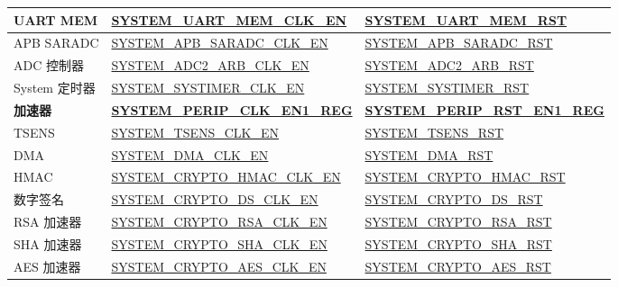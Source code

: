 \documentclass[main\_\_CN.tex]{subfiles}
\begin{document}
\begin{ThreePartTable}
\begin{longtable}[c]{ |l|l|l| }
    UART MEM    & \hyperref[fielddesc:SYSTEMUARTMEMCLKEN]{SYSTEM\_UART\_MEM\_CLK\_EN} \tnote{4} & \hyperref[fielddesc:SYSTEMUARTMEMRST]{SYSTEM\_UART\_MEM\_RST} \\\hline
    APB SARADC    & \hyperref[fielddesc:SYSTEMAPBSARADCCLKEN]{SYSTEM\_APB\_SARADC\_CLK\_EN} & \hyperref[fielddesc:SYSTEMAPBSARADCRST]{SYSTEM\_APB\_SARADC\_RST} \\\hline
    ADC 控制器    & \hyperref[fielddesc:SYSTEMADC2ARBCLKEN]{SYSTEM\_ADC2\_ARB\_CLK\_EN} & \hyperref[fielddesc:SYSTEMADC2ARBRST]{SYSTEM\_ADC2\_ARB\_RST} \\\hline
    System 定时器    & \hyperref[fielddesc:SYSTEMSYSTIMERCLKEN]{SYSTEM\_SYSTIMER\_CLK\_EN} & \hyperref[fielddesc:SYSTEMSYSTIMERRST]{SYSTEM\_SYSTIMER\_RST} \\\hline

    \textbf{加速器} & \textbf{\hyperref[regdesc:SYSTEMPERIPCLKEN1REG]{SYSTEM\_PERIP\_CLK\_EN1\_REG}} & \textbf{\hyperref[regdesc:SYSTEMPERIPRSTEN1REG]{SYSTEM\_PERIP\_RST\_EN1\_REG}} \\ \hline

    TSENS & \hyperref[fielddesc:SYSTEMTSENSCLKEN]{SYSTEM\_TSENS\_CLK\_EN} & \hyperref[fielddesc:SYSTEMTSENSRST]{SYSTEM\_TSENS\_RST} \\\hline
    DMA & \hyperref[fielddesc:SYSTEMDMACLKEN]{SYSTEM\_DMA\_CLK\_EN} & \hyperref[fielddesc:SYSTEMDMARST]{SYSTEM\_DMA\_RST}\tnote{5}  \\\hline
    HMAC & \hyperref[fielddesc:SYSTEMCRYPTOHMACCLKEN]{SYSTEM\_CRYPTO\_HMAC\_CLK\_EN} & \hyperref[fielddesc:SYSTEMCRYPTOHMACRST]{SYSTEM\_CRYPTO\_HMAC\_RST} \tnote{6} \\\hline
    数字签名 & \hyperref[fielddesc:SYSTEMCRYPTODSCLKEN]{SYSTEM\_CRYPTO\_DS\_CLK\_EN} & \hyperref[fielddesc:SYSTEMCRYPTODSRST]{SYSTEM\_CRYPTO\_DS\_RST} \tnote{7} \\\hline
    RSA 加速器 & \hyperref[fielddesc:SYSTEMCRYPTORSACLKEN]{SYSTEM\_CRYPTO\_RSA\_CLK\_EN} & \hyperref[fielddesc:SYSTEMCRYPTORSARST]{SYSTEM\_CRYPTO\_RSA\_RST} \\\hline
    SHA 加速器 & \hyperref[fielddesc:SYSTEMCRYPTOSHACLKEN]{SYSTEM\_CRYPTO\_SHA\_CLK\_EN} & \hyperref[fielddesc:SYSTEMCRYPTOSHARST]{SYSTEM\_CRYPTO\_SHA\_RST} \\\hline
    AES 加速器 & \hyperref[fielddesc:SYSTEMCRYPTOAESCLKEN]{SYSTEM\_CRYPTO\_AES\_CLK\_EN} & \hyperref[fielddesc:SYSTEMCRYPTOAESRST]{SYSTEM\_CRYPTO\_AES\_RST} \\\hline

\end{longtable}
\end{ThreePartTable}
\end{document}

